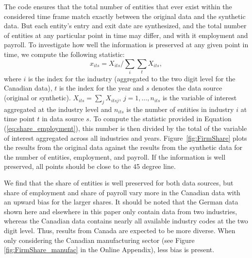 The \SynLBD{} code  ensures that the total number of entities that ever exist within the considered time frame  match exactly between the original data and the synthetic data. But  each entity's entry and exit date are synthesized, and the total number of entities at any particular point in time may differ, and with it employment and payroll. To investigate how well the information is preserved at any given point in time, we compute the following statistic:
\begin{equation}
    \label{eq:share_employment}
x_{its} = X_{its}/\sum_{i} \sum_{t} X_{its}, 
\end{equation}
where $i$ is the index for the industry (aggregated to the two digit level for the Canadian data), $t$ is the index for the year and $s$ denotes the data source (original or synthetic). $X_{its}=\sum_j X_{itsj}$, $j=1,\ldots,n_{its}$ is the variable of interest aggregated at the industry level and $n_{its}$ is the number of entities in industry $i$ at time point $t$ in data source $s$. 
To compute the statistic provided in Equation (\ref{eq:share_employment}), this number is then divided by the total of the variable of interest aggregated across all industries and years.
Figure~\ref{fig:FirmShare} plots the results from the original data against the results from the synthetic data for the  number of entities, employment, and {payroll}. If the information is well preserved, all points should be close to the 45 degree line. 



We find that the share of entities is well preserved for both data sources, but share of employment and share of payroll vary more in the Canadian data with an upward bias for the larger shares. 
It should be noted that the German data shown here and elsewhere in this paper only contain data from two industries, whereas the Canadian data contains nearly all  available industry codes at the two digit level. Thus, results from Canada are expected to be more diverse. 
When only considering the Canadian manufacturing sector (see Figure \ref{fig:FirmShare_manufac} in the Online Appendix), less bias is present.




